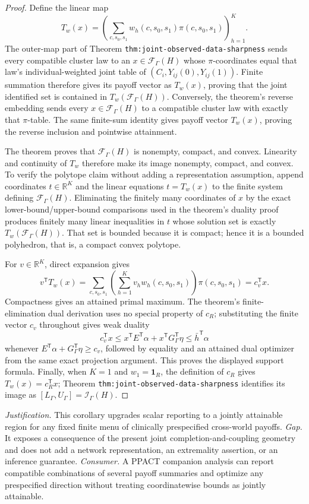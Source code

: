 \documentclass{article}
\begin{document}
\begin{proof}
Define the linear map
\[
T_w(x)=\left(\sum_{c,s_0,s_1}w_h(c,s_0,s_1)\pi(c,s_0,s_1)\right)_{h=1}^{K}.
\]
The outer-map part of Theorem \texttt{thm:joint-observed-data-sharpness} sends every compatible cluster law to an \(x\in\mathcal F_{\Gamma}(H)\) whose \(\pi\)-coordinates equal that law's individual-weighted joint table of \((C_i,Y_{ij}(0),Y_{ij}(1))\).  Finite summation therefore gives its payoff vector as \(T_w(x)\), proving that the joint identified set is contained in \(T_w(\mathcal F_{\Gamma}(H))\).  Conversely, the theorem's reverse embedding sends every \(x\in\mathcal F_{\Gamma}(H)\) to a compatible cluster law with exactly that \(\pi\)-table.  The same finite-sum identity gives payoff vector \(T_w(x)\), proving the reverse inclusion and pointwise attainment.

The theorem proves that \(\mathcal F_{\Gamma}(H)\) is nonempty, compact, and convex.  Linearity and continuity of \(T_w\) therefore make its image nonempty, compact, and convex.  To verify the polytope claim without adding a representation assumption, append coordinates \(t\in\mathbb R^K\) and the linear equations \(t=T_w(x)\) to the finite system defining \(\mathcal F_{\Gamma}(H)\).  Eliminating the finitely many coordinates of \(x\) by the exact lower-bound/upper-bound comparisons used in the theorem's duality proof produces finitely many linear inequalities in \(t\) whose solution set is exactly \(T_w(\mathcal F_{\Gamma}(H))\).  That set is bounded because it is compact; hence it is a bounded polyhedron, that is, a compact convex polytope.

For \(v\in\mathbb R^K\), direct expansion gives
\[
v^{\mathsf T}T_w(x)
=\sum_{c,s_0,s_1}\left(\sum_{h=1}^{K}v_hw_h(c,s_0,s_1)\right)
\pi(c,s_0,s_1)
=c_v^{\mathsf T}x.
\]
Compactness gives an attained primal maximum.  The theorem's finite-elimination dual derivation uses no special property of \(c_R\); substituting the finite vector \(c_v\) throughout gives weak duality
\[
c_v^{\mathsf T}x
\leq x^{\mathsf T}E^{\mathsf T}\alpha+x^{\mathsf T}G_{\Gamma}^{\mathsf T}\eta
\leq\bar h^{\mathsf T}\alpha
\]
whenever \(E^{\mathsf T}\alpha+G_{\Gamma}^{\mathsf T}\eta\geq c_v\), followed by equality and an attained dual optimizer from the same exact projection argument.  This proves the displayed support formula.  Finally, when \(K=1\) and \(w_1=\mathbf 1_R\), the definition of \(c_R\) gives \(T_w(x)=c_R^{\mathsf T}x\); Theorem \texttt{thm:joint-observed-data-sharpness} identifies its image as \([L_{\Gamma},U_{\Gamma}]=\mathcal I_{\Gamma}(H)\).
\end{proof}
\par\smallskip\noindent \textit{Justification.} This corollary upgrades scalar reporting to a jointly attainable region for any fixed finite menu of clinically prespecified cross-world payoffs. \textit{Gap.} It exposes a consequence of the present joint completion-and-coupling geometry and does not add a network representation, an extremality assertion, or an inference guarantee. \textit{Consumer.} A PPACT companion analysis can report compatible combinations of several payoff summaries and optimize any prespecified direction without treating coordinatewise bounds as jointly attainable.
\end{document}
